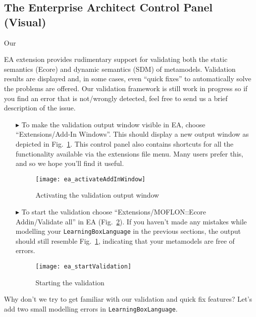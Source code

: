 \visHeader
\subsection{The Enterprise Architect Control Panel (Visual) }

\hypertarget{validation vis}{Our} EA extension provides rudimentary support for validating both the static semantics (Ecore) and dynamic semantics (SDM) of
metamodels. Validation results are displayed and, in some cases, even ``quick fixes'' to automatically solve the problems are offered. Our validation framework
is still work in progress so if you find an error that is not/wrongly detected, feel free to send us a brief description of the issue.

\begin{enumerate}
\item[$\blacktriangleright$] To make the validation output window visible in EA, choose ``Extensions/\-Add-In Windows''. This should display a new output window
as depicted in Fig.~\ref{fig:validation_output}. This control panel also contains shortcuts for all the functionality available via the extensions file menu.
Many users prefer this, and so we hope you'll find it useful.

\begin{figure}[htbp]
	\centering
  \texttt{[image: ea\_activateAddInWindow]}
	\caption{Activating the validation output window}
	\label{fig:validation_output}
\end{figure}
\FloatBarrier

\item[$\blacktriangleright$] To start the validation choose ``Extensions/\-MOFLON::Ecore Addin/\-Validate all'' in EA (Fig.~\ref{fig:validation_menu}).
If you haven't made any mistakes while modelling your \texttt{LearningBoxLanguage} in the previous sections, the output should still resemble
Fig.~\ref{fig:validation_output}, indicating that your metamodels are free of errors.

\begin{figure}[htbp]
	\centering
  \texttt{[image: ea\_startValidation]}
	\caption{Starting the validation}
	\label{fig:validation_menu}
\end{figure}
\FloatBarrier
\end{enumerate}


Why don't we try to get familiar with our validation and quick fix features? Let's add two small modelling errors in \texttt{LearningBoxLanguage}.


